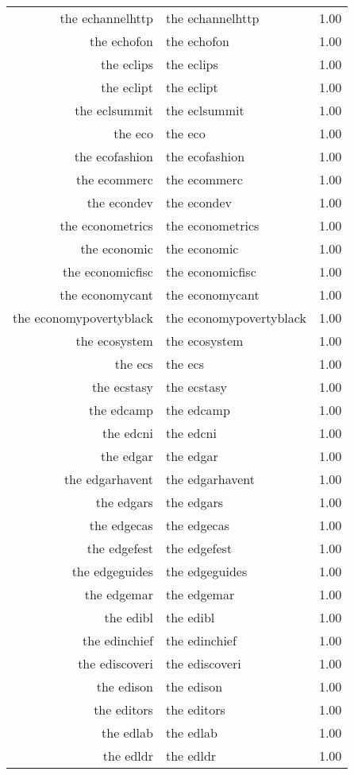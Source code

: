 \begin{table}[ht]
\begin{tabular}{rlr}
  the echannelhttp & the echannelhttp & 1.00 \\ 
  the echofon & the echofon & 1.00 \\ 
  the eclips & the eclips & 1.00 \\ 
  the eclipt & the eclipt & 1.00 \\ 
  the eclsummit & the eclsummit & 1.00 \\ 
  the eco & the eco & 1.00 \\ 
  the ecofashion & the ecofashion & 1.00 \\ 
  the ecommerc & the ecommerc & 1.00 \\ 
  the econdev & the econdev & 1.00 \\ 
  the econometrics & the econometrics & 1.00 \\ 
  the economic & the economic & 1.00 \\ 
  the economicfisc & the economicfisc & 1.00 \\ 
  the economycant & the economycant & 1.00 \\ 
  the economypovertyblack & the economypovertyblack & 1.00 \\ 
  the ecosystem & the ecosystem & 1.00 \\ 
  the ecs & the ecs & 1.00 \\ 
  the ecstasy & the ecstasy & 1.00 \\ 
  the edcamp & the edcamp & 1.00 \\ 
  the edcni & the edcni & 1.00 \\ 
  the edgar & the edgar & 1.00 \\ 
  the edgarhavent & the edgarhavent & 1.00 \\ 
  the edgars & the edgars & 1.00 \\ 
  the edgecas & the edgecas & 1.00 \\ 
  the edgefest & the edgefest & 1.00 \\ 
  the edgeguides & the edgeguides & 1.00 \\ 
  the edgemar & the edgemar & 1.00 \\ 
  the edibl & the edibl & 1.00 \\ 
  the edinchief & the edinchief & 1.00 \\ 
  the ediscoveri & the ediscoveri & 1.00 \\ 
  the edison & the edison & 1.00 \\ 
  the editors & the editors & 1.00 \\ 
  the edlab & the edlab & 1.00 \\ 
  the edldr & the edldr & 1.00 \\ 

\end{tabular}
\end{table}
